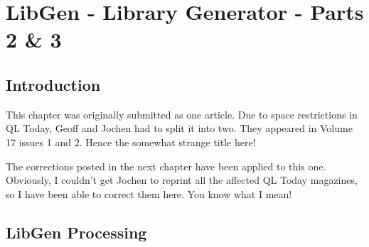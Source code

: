 \chapter{LibGen -{} Library Generator -{} Parts 2 \& 3}

\section{Introduction}
\label{ch32-intro}%

\begin{note}
This chapter was originally submitted as one article. Due to space
      restrictions in QL Today, Geoff and Jochen had to split it into two.
      They appeared in Volume 17 issues 1 and 2. Hence the somewhat strange title here!

The corrections posted in the next chapter have been applied to
      this one. Obviously, I couldn't get Jochen to reprint all the affected
      QL Today magazines, so I have been able to correct them here. You know
      what I mean!
\end{note}

\section{LibGen Processing}
\label{ch32-lib-gen-processing}%

